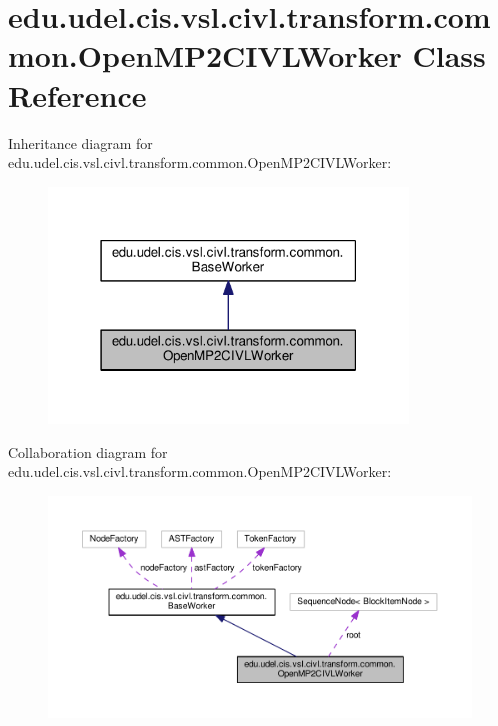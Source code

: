 \hypertarget{classedu_1_1udel_1_1cis_1_1vsl_1_1civl_1_1transform_1_1common_1_1OpenMP2CIVLWorker}{}\section{edu.\+udel.\+cis.\+vsl.\+civl.\+transform.\+common.\+Open\+M\+P2\+C\+I\+V\+L\+Worker Class Reference}
\label{classedu_1_1udel_1_1cis_1_1vsl_1_1civl_1_1transform_1_1common_1_1OpenMP2CIVLWorker}


Inheritance diagram for edu.\+udel.\+cis.\+vsl.\+civl.\+transform.\+common.\+Open\+M\+P2\+C\+I\+V\+L\+Worker\+:
\nopagebreak
\begin{figure}[H]
\begin{center}
\leavevmode
\includegraphics[width=271pt]{classedu_1_1udel_1_1cis_1_1vsl_1_1civl_1_1transform_1_1common_1_1OpenMP2CIVLWorker__inherit__graph}
\end{center}
\end{figure}


Collaboration diagram for edu.\+udel.\+cis.\+vsl.\+civl.\+transform.\+common.\+Open\+M\+P2\+C\+I\+V\+L\+Worker\+:
\nopagebreak
\begin{figure}[H]
\begin{center}
\leavevmode
\includegraphics[width=350pt]{classedu_1_1udel_1_1cis_1_1vsl_1_1civl_1_1transform_1_1common_1_1OpenMP2CIVLWorker__coll__graph}
\end{center}
\end{figure}
